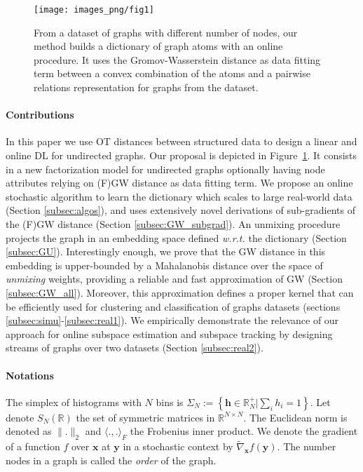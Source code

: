 \documentclass{article}
\newcommand{\scalar}[2]{\langle #1 , #2 \rangle}
\def\vx{{\bm{x}}}
\def\vy{{\bm{y}}}
\newcommand{\R}{\mathbb{R}}
\def\R{{\mathbb{R}}}
\begin{document}
	\begin{figure}[!t]
		\texttt{[image: images\_png/fig1]}\vspace{-8mm}
		\caption{ From a dataset of graphs with different number of nodes, our method builds
			a dictionary of graph atoms with an online procedure. It uses the
			Gromov-Wasserstein distance as data fitting term between a  convex
			combination of the atoms and a pairwise relations representation for graphs
			from the dataset.}
		\label{fig:f1}
		\vspace{-5mm}
	\end{figure}
	
	\paragraph{Contributions}
	In this paper we use OT distances between structured data to design a linear and online DL for undirected graphs. Our proposal is depicted in Figure~\ref{fig:f1}. It
	consists in a new factorization model for undirected graphs optionally having node attributes relying on (F)GW distance as data fitting term. We propose an online 
	stochastic algorithm to learn the dictionary which scales to large real-world
	data (Section \ref{subsec:algos}), and uses extensively novel derivations of
	sub-gradients of the (F)GW distance (Section \ref{subsec:GW_subgrad}).  An
	unmixing procedure projects the graph in an embedding space defined {\em w.r.t.}
	the dictionary (Section \ref{subsec:GU}). Interestingly enough, we prove that
	the GW distance in this embedding is upper-bounded by a Mahalanobis distance
	over the space of \emph{unmixing} weights, providing a reliable and fast
	approximation of GW (Section \ref{subsec:GW_all}). Moreover, this approximation
	defines a proper kernel that can be efficiently used for clustering and
	classification of graphs datasets (sections
	\ref{subsec:simu}-\ref{subsec:real1}). We empirically demonstrate the relevance
	of our approach for online subspace estimation and subspace tracking by
	designing streams of graphs over two datasets (Section \ref{subsec:real2}).
	
	\paragraph{Notations}
	The simplex of histograms with $N$ bins is $\Sigma_N := \left\{\mathbf{h}\in
	\mathbb{R}^+_N| \sum_i h_i = 1 \right\}$. Let
	denote  $S_N(\R)$ the set of symmetric matrices in $\R^{N\times N}$. The Euclidean norm is denoted as $\|.\|_2$ and $\scalar{.}{.}_F$ the Frobenius inner product. We denote the gradient of a function $f$ over $\vx$ at $\vy$ in a stochastic context by $\widetilde{\nabla}_{\vx}f(\vy)$. The number nodes in a graph is called  the \emph{order} of the graph.
	
\end{document}

